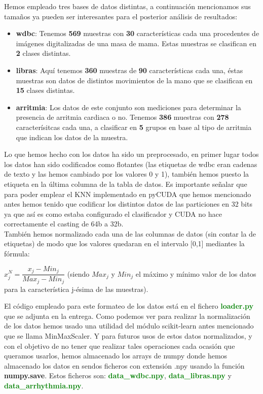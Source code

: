 \documentclass[10pt,a4paper]{article}
\begin{document}
Hemos empleado tres bases de datos distintas, a continuación mencionamos sus tamaños ya pueden ser interesantes para el posterior análisis de resultados:\\

\begin{itemize}
\item \textbf{wdbc}: Tenemos \textbf{569} muestras con \textbf{30} características cada una procedentes de imágenes digitalizadas de una masa de mama. Estas muestras se clasifican en \textbf{2} clases distintas.
\item \textbf{libras}: Aquí tenemos \textbf{360} muestras de \textbf{90} características cada una, éstas muestras son datos de distintos movimientos de la mano que se clasifican en \textbf{15} clases distintas.
\item \textbf{arritmia}: Los datos de este conjunto son mediciones para determinar la presencia de arritmia cardiaca o no. Tenemos \textbf{386} muestras con \textbf{278} caracterísitcas cada una, a clasificar en \textbf{5} grupos en base al tipo de arritmia que indican los datos de la muestra.
\end{itemize}

Lo que hemos hecho con los datos ha sido un preprocesado, en primer lugar todos los datos han sido codificados como flotantes (las etiquetas de wdbc eran cadenas de texto y las hemos cambiado por los valores 0 y 1), también hemos puesto la etiqueta en la última columna de la tabla de datos. Es importante señalar que para poder emplear el KNN implementado en pyCUDA que hemos mencionado antes hemos tenido que codificar los distintos datos de las particiones en 32 bits ya que así es como estaba configurado el clasificador y CUDA no hace correctamente el casting de 64b a 32b.\\

También hemos normalizado cada una de las columnas de datos (sin contar la de etiquetas) de modo que los valores quedaran en el intervalo [0,1] mediantes la fórmula:\\

\begin{center}
$x_j^N = \dfrac{x_j - Min_j}{Max_j-Min_j}$ (siendo $Max_j$ y $Min_j$ el máximo y mínimo valor de los datos para la característica j-ésima de las muestras).
\end{center}

El código empleado para este formateo de los datos está en el fichero \textbf{\textcolor{green}{loader.py}} que se adjunta en la entrega. Como podemos ver para realizar la normalización de los datos hemos usado una utilidad del módulo scikit-learn antes mencionado que se llama MinMaxScaler. Y para futuros usos de estos datos normalizados, y con el objetivo de no tener que realizar tales operaciones cada ocasión que queramos usarlos, hemos almacenado los arrays de numpy donde hemos almacenado los datos en sendos ficheros con extensión .npy usando la función \textbf{numpy.save}. Estos ficheros son: \textbf{\textcolor{green}{data\_wdbc.npy}}, \textbf{\textcolor{green}{data\_libras.npy}} y \textbf{\textcolor{green}{data\_arrhythmia.npy}}.\\
\end{document}
